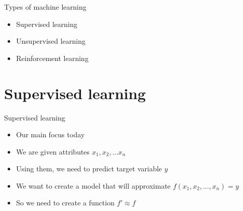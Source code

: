 \documentclass[aspectratio=169]{beamer}
\begin{document}
\begin{frame}{Types of machine learning}
    \begin{itemize}
        \item Supervised learning
        \item Unsupervised learning
        \item Reinforcement learning
    \end{itemize}
\end{frame}
\section{Supervised learning}
\begin{frame}{Supervised learning}
    \begin{itemize}
        \item Our main focus today
        \item We are given attributes $x_1, x_2, ... x_n$
        \item Using them, we need to predict target variable $y$
        \item We want to create a model that will approximate $f(x_1, x_2, ..., x_n) = y$
        \item So we need to create a function $f' \approx f$
    \end{itemize}
\end{frame}
\end{document}
